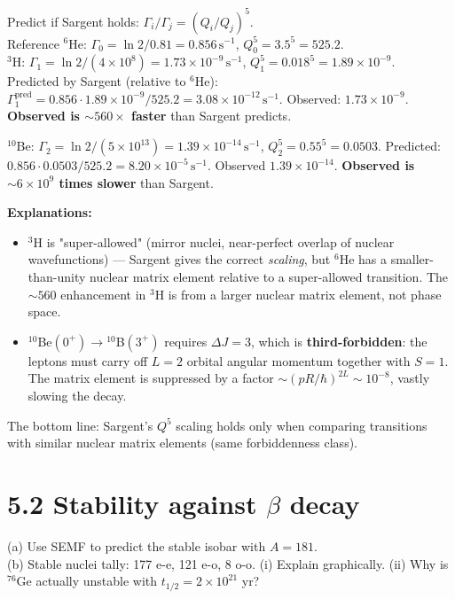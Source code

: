 \documentclass[11pt]{article}
\newcommand{\Q}[1]{\begin{question}#1\end{question}}
\begin{document}
Predict if Sargent holds: $\Gamma_i/\Gamma_j=(Q_i/Q_j)^{5}$.\\
Reference $^{6}$He: $\Gamma_0=\ln 2/0.81=0.856\,\mathrm{s^{-1}}$, $Q_0^{5}=3.5^{5}=525.2$.\\
$^{3}$H: $\Gamma_1=\ln 2/(4\times 10^{8})=1.73\times 10^{-9}\,\mathrm{s^{-1}}$, $Q_1^{5}=0.018^{5}=1.89\times 10^{-9}$.\\
Predicted by Sargent (relative to $^{6}$He): $\Gamma_1^\mathrm{pred}=0.856\cdot 1.89\times 10^{-9}/525.2=3.08\times 10^{-12}\,\mathrm{s^{-1}}$. Observed: $1.73\times 10^{-9}$. \textbf{Observed is $\sim 560\times$ faster} than Sargent predicts.

$^{10}$Be: $\Gamma_2=\ln 2/(5\times 10^{13})=1.39\times 10^{-14}\,\mathrm{s^{-1}}$, $Q_2^{5}=0.55^{5}=0.0503$. Predicted: $0.856\cdot 0.0503/525.2=8.20\times 10^{-5}\,\mathrm{s^{-1}}$. Observed $1.39\times 10^{-14}$. \textbf{Observed is $\sim 6\times 10^{9}$ times slower} than Sargent.

\textbf{Explanations:}
\begin{itemize}[itemsep=1pt]
\item $^{3}$H is "super-allowed" (mirror nuclei, near-perfect overlap of nuclear wavefunctions) — Sargent gives the correct \emph{scaling}, but $^{6}$He has a smaller-than-unity nuclear matrix element relative to a super-allowed transition. The $\sim 560$ enhancement in $^3$H is from a larger nuclear matrix element, not phase space.
\item $^{10}$Be$(0^+)\to{}^{10}$B$(3^+)$ requires $\Delta J=3$, which is \textbf{third-forbidden}: the leptons must carry off $L=2$ orbital angular momentum together with $S=1$. The matrix element is suppressed by a factor $\sim(p R/\hbar)^{2L}\sim 10^{-8}$, vastly slowing the decay.
\end{itemize}

The bottom line: Sargent's $Q^{5}$ scaling holds only when comparing transitions with similar nuclear matrix elements (same forbiddenness class).

\section*{5.2 \quad Stability against $\beta$ decay}

\Q{(a) Use SEMF to predict the stable isobar with $A=181$.\\
(b) Stable nuclei tally: 177 e-e, 121 e-o, 8 o-o. (i) Explain graphically. (ii) Why is $^{76}$Ge actually unstable with $t_{1/2}=2\times 10^{21}$ yr?}
\end{document}
